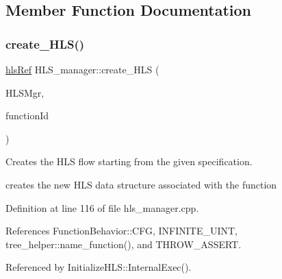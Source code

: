 \subsection{Member Function Documentation}
\mbox{\label{classHLS__manager_a0b8d2323f8e04cfe68b27e5ec8c4566c}} 
\subsubsection{\texorpdfstring{create\+\_\+\+H\+L\+S()}{create\_HLS()}}
{\footnotesize\ttfamily \hyperlink{hls_8hpp_a75d0c73923d0ddfa28c4843a802c73a7}{hls\+Ref} H\+L\+S\+\_\+manager\+::create\+\_\+\+H\+LS (\begin{DoxyParamCaption}\item[{const \hyperlink{hls__manager_8hpp_acd3842b8589fe52c08fc0b2fcc813bfe}{H\+L\+S\+\_\+manager\+Ref}}]{H\+L\+S\+Mgr,  }\item[{unsigned int}]{function\+Id }\end{DoxyParamCaption})\hspace{0.3cm}{\ttfamily [static]}}



Creates the H\+LS flow starting from the given specification. 

creates the new H\+LS data structure associated with the function 

Definition at line 116 of file hls\+\_\+manager.\+cpp.



References Function\+Behavior\+::\+C\+FG, I\+N\+F\+I\+N\+I\+T\+E\+\_\+\+U\+I\+NT, tree\+\_\+helper\+::name\+\_\+function(), and T\+H\+R\+O\+W\+\_\+\+A\+S\+S\+E\+RT.



Referenced by Initialize\+H\+L\+S\+::\+Internal\+Exec().

